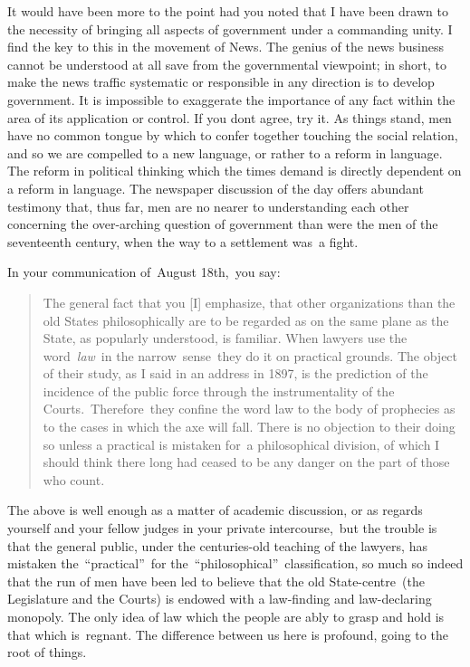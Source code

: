 \documentclass[twoside,symmetric,nobib,justified]{tufte-book}
\begin{document}
It would have been more to the point had you noted that I have been
drawn to the necessity of bringing all aspects of government under a
commanding unity. I find the key to this in the movement of News. The
genius of the news business cannot be understood at all save from the
governmental viewpoint; in short, to make the news traffic systematic or
responsible in any direction is to develop government. It is impossible
to exaggerate the importance of any fact within the area of its
application or control. If you don\textquotesingle t agree, try it. As
things stand, men have no common tongue by which to confer together
touching the social relation, and so we are compelled to a new language,
or rather to a reform in language. The reform in political thinking
which the times demand is directly dependent on a reform in language.
The newspaper discussion of the day offers abundant testimony that, thus
far, men are no nearer to understanding each other concerning the
over-arching question of government than were the men of the seventeenth
century, when the way to a settlement was~a fight.~

In your communication of~August 18th,~you say:~

\begin{quote}
The general fact that you {[}I{]} emphasize, that other organizations
than the old States philosophically are to be regarded as on the same
plane as the State, as popularly understood, is familiar. When lawyers
use the word~\emph{law}~in the narrow~sense~they do it on practical
grounds. The object of their study, as I said in an address in 1897, is
the prediction of the incidence of the public force through the
instrumentality of the Courts.~Therefore~they confine the word law to
the body of prophecies as to the cases in which the axe will fall. There
is no objection to their doing so unless a practical is mistaken for~a
philosophical division, of which I should think there long had ceased to
be any danger on the part of those who count.
\end{quote}

The above is well enough as a matter of academic discussion, or as
regards yourself and your fellow judges in your private intercourse,~but
the trouble is that the general public, under the centuries-old teaching
of the lawyers, has mistaken the~``practical''~for
the~``philosophical''~classification, so much so indeed that the run of
men have been led to believe that the old State-centre~(the Legislature
and the Courts) is endowed with a law-finding and law-declaring
monopoly. The only idea of law which the people are ably to grasp and
hold is that which is~regnant. The difference between us here is
profound, going to the root of things.~
\end{document}
